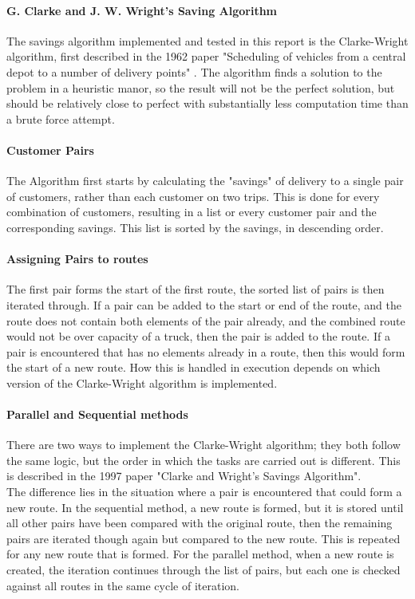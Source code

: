 \documentclass[conference]{acmsiggraph}
\begin{document}
\paragraph{G. Clarke and J. W. Wright's Saving Algorithm}
The savings algorithm implemented and tested in this report is the Clarke-Wright algorithm, first described in the 1962 paper "Scheduling of vehicles from a central depot to a number of delivery points" \cite{CW}.
The algorithm finds a solution to the problem in a heuristic manor, so the result will not be the perfect solution, but should be relatively close to perfect with substantially less computation time than a brute force attempt. 

\paragraph{Customer Pairs}
The Algorithm first starts by calculating the "savings" of delivery to a single pair of customers, rather than each customer on two trips. This is done for every combination of customers, resulting in a list or every customer pair and the corresponding savings. This list is sorted by the savings, in descending order.

\paragraph{Assigning Pairs to routes}
The first pair forms the start of the first route, the sorted list of pairs is then iterated through. If a pair can be added to the start or end of the route, and the route does not contain both elements of the pair already, and the combined route would not be over capacity of a truck, then the pair is added to the route. If a pair is encountered that has no elements already in a route, then this would form the start of a new route. How this is handled in execution depends on which version of the Clarke-Wright algorithm is implemented.

\paragraph{Parallel and Sequential methods}
There are two ways to implement the Clarke-Wright algorithm; they both follow the same logic, but the order in which the tasks are carried out is different. This is described in the 1997 paper "Clarke and Wright's Savings Algorithm"\cite{CWj}.\\
The difference lies in the situation where a pair is encountered that could form a new route. In the sequential method, a new route is formed, but it is stored until all other pairs have been compared with the original route, then the remaining pairs are iterated though again but compared to the new route. This is repeated for any new route that is formed.
For the parallel method, when a new route is created, the iteration continues through the list of pairs, but each one is checked against all routes in the same cycle of iteration.
\end{document}
